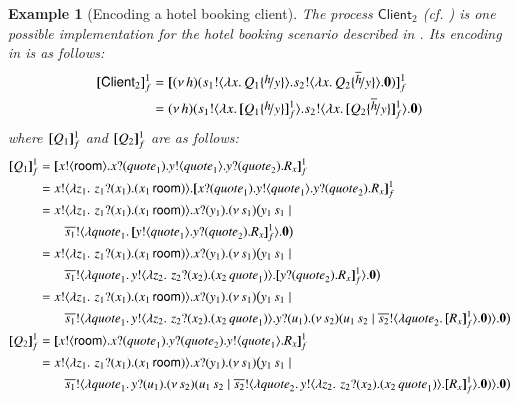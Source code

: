 \documentclass[preprint,11pt]{elsarticle}
\newtheorem{example}{Example}[section]
\newcommand{\rtype}{\mathsf{room}}
\newcommand{\Quotev}{\mathit{quote}}
\newcommand{\Client}{\mathsf{Client}}
\begin{document}
{\begin{example}[Encoding a hotel booking client]
The \HOp process $\Client_2$ (cf. ) is one possible implementation for the 
hotel booking scenario described in 
. Its encoding in \HO is as follows:
\begin{align*}
\pmap{\Client_2}{1}_f & = \pmap{\newsp{h}{\bout{s_1}{\abs{x}{Q_1 \subst{h}{y}}} \bout{s_2}{\abs{x}{Q_2 \subst{\dual{h}}{y}}} \inact}}{1}_f
\\
 & = \newsp{h}{\bout{s_1}{\abs{x}{\pmap{Q_1 \subst{h}{y}}{1}_f}} \bout{s_2}{\abs{x}{\pmap{Q_2 \subst{\dual{h}}{y}}{1}_f} }\inact}
\end{align*}
where $[\!\![Q_1]\!\!]^1_f$ and $[\!\![Q_2]\!\!]^1_f$ are as follows:
\begin{align*}
 \pmap{Q_1}{1}_f & = \pmap{\bout{x}{\rtype} \binp{x}{\Quotev_1} \bout{y}{\Quotev_1} \binp{y}{\Quotev_2} R_x}{1}_f
 \\
 & = \bout{x}{ \abs{z_1}{\,\binp{z_1}{x_1} (\appl{x_1}{\rtype})} } \pmap{\binp{x}{\Quotev_1} \bout{y}{\Quotev_1} \binp{y}{\Quotev_2} R_x}{1}_f \\
 & =  \bout{x}{ \abs{z_1}{\,\binp{z_1}{x_1} (\appl{x_1}{\rtype})} } \binp{x}{y_1} \newspb{s_1}{\appl{y_1}{s_1} \Par 
 \\
& \qquad  \bout{\dual{s_1}}{\abs{\Quotev_1}{\pmapp{\bout{y}{\Quotev_1} \binp{y}{\Quotev_2} R_x}{1}{f}}} \inact}
\\
 & =  \bout{x}{ \abs{z_1}{\,\binp{z_1}{x_1} (\appl{x_1}{\rtype})} } \binp{x}{y_1} \newspb{s_1}{\appl{y_1}{s_1} \Par 
 \\
& \qquad  \bout{\dual{s_1}}{\abs{\Quotev_1}{\bout{y}{ \abs{z_2}{\,\binp{z_2}{x_2} (\appl{x_2}{\Quotev_1})} }\pmapp{ \binp{y}{\Quotev_2} R_x}{1}{f}}} \inact}
 \\
 & =  \bout{x}{ \abs{z_1}{\,\binp{z_1}{x_1} (\appl{x_1}{\rtype})} } \binp{x}{y_1} \newspb{s_1}{\appl{y_1}{s_1} \Par 
 \\
& \qquad  \bout{\dual{s_1}}{\abs{\Quotev_1}{\bout{y}{ \abs{z_2}{\,\binp{z_2}{x_2} (\appl{x_2}{\Quotev_1})} }\binp{y}{u_1} \newsp{s_2}{\appl{u_1}{s_2} \Par \bout{\dual{s_2}}{\abs{\Quotev_2}{\pmapp{R_x}{1}{f}}} \inact}}} \inact}
\\
 \pmap{Q_2}{1}_f & = \pmap{\bout{x}{\rtype} \binp{x}{\Quotev_1}  \binp{y}{\Quotev_2} \bout{y}{\Quotev_1} R_x}{1}_f
 \\
& =  \bout{x}{ \abs{z_1}{\,\binp{z_1}{x_1} (\appl{x_1}{\rtype})} } \binp{x}{y_1} \newspb{s_1}{\appl{y_1}{s_1} \Par 
 \\
& \qquad  \bout{\dual{s_1}}{\abs{\Quotev_1}{\binp{y}{u_1} \newsp{s_2}{\appl{u_1}{s_2} \Par \bout{\dual{s_2}}{\abs{\Quotev_2}{\bout{y}{ \abs{z_2}{\,\binp{z_2}{x_2} (\appl{x_2}{\Quotev_1})} }\pmapp{R_x}{1}{f}}} \inact}}} \inact}

\end{align*}
\end{example}}
\end{document}
